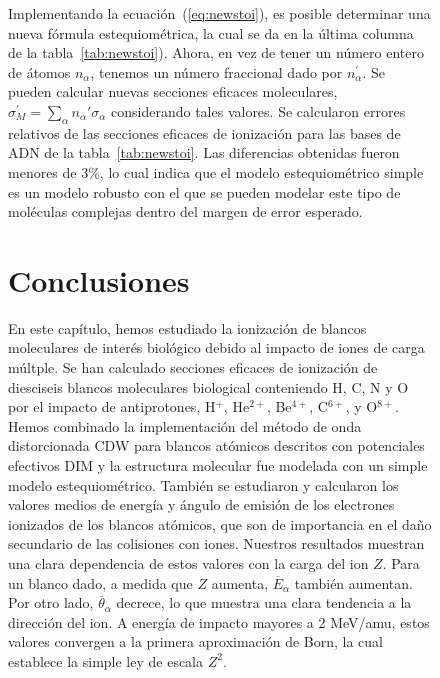 \begin{figure}
Implementando la ecuación~(\ref{eq:newstoi}), es posible determinar
una nueva fórmula estequiométrica, la cual se da en la última columna de
la tabla~\ref{tab:newstoi}). Ahora, en vez de tener un número entero 
de átomos $n_{\alpha}$, tenemos un número fraccional dado por 
$n_{\alpha}^{\prime}$. Se pueden calcular nuevas secciones eficaces 
moleculares, $\sigma^{\prime}_{M}=\sum_{\alpha}n_{\alpha}'\sigma_{\alpha}$
considerando tales valores. Se calcularon errores relativos de las 
secciones eficaces de ionización para las bases de ADN de la 
tabla~\ref{tab:newstoi}. Las diferencias obtenidas fueron menores de
3\%, lo cual indica que el modelo estequiométrico simple 
es un modelo robusto con el que se pueden modelar este tipo de 
moléculas complejas dentro del margen de error esperado.

\section{Conclusiones}

En este capítulo, hemos estudiado la ionización de blancos moleculares 
de interés biológico debido al impacto de iones de carga múltple. Se han
calculado secciones eficaces de ionización de diesciseis blancos 
moleculares biological conteniendo H, C, N y O por el impacto de
antiprotones, H$^{+}$, He$^{2+}$, Be$^{4+}$, C$^{6+}$, y O$^{8+}$. 
Hemos combinado la implementación del método de onda distorcionada
CDW para blancos atómicos descritos con potenciales efectivos DIM y la 
estructura molecular fue modelada con un simple modelo estequiométrico.
También se estudiaron y calcularon los valores medios de energía y 
ángulo de emisión de los electrones ionizados de los blancos atómicos, 
que son de importancia en el daño secundario de las colisiones con iones.
Nuestros resultados muestran una clara dependencia de estos valores con 
la carga del ion $Z$. Para un blanco dado, a medida que $Z$ aumenta,
$\overline{E}_{\alpha}$ también aumentan. Por otro lado, 
$\overline{\theta}_{\alpha}$ decrece, lo que muestra una clara tendencia 
a la dirección del ion. A energía de impacto mayores a 2 MeV/amu, estos
valores convergen a la primera aproximación de Born, la cual establece 
la simple ley de escala $Z^{2}$. 


\end{figure}
